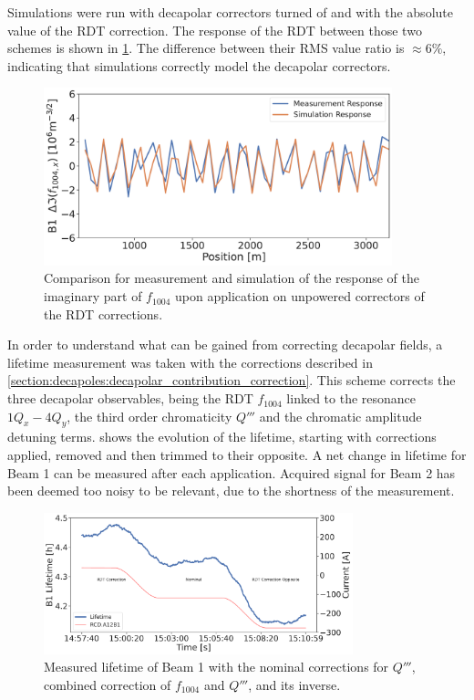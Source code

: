 Simulations were run with decapolar correctors turned of and with the absolute value of the RDT
correction. The response of the RDT between those two schemes is shown in 
\cref{fig:decapoles:rdt:b1_response_corr}. The difference between their RMS value ratio is $\approx
6\%$, indicating that simulations correctly model the decapolar correctors.

\begin{figure}[!htb]
    \centering
    \includegraphics[width=0.9\textwidth]{./images/f1004/b1_response_rdt_corr.pdf}
    \caption{Comparison for measurement and simulation of the response of the imaginary part of
    $f_{1004}$ upon application on unpowered correctors of the RDT corrections.}
    \label{fig:decapoles:rdt:b1_response_corr}
\end{figure}


In order to understand what can be gained from correcting decapolar fields, a lifetime measurement
was taken with the corrections described in 
\cref{section:decapoles:decapolar_contribution_correction}. This scheme corrects the three decapolar 
observables, being the RDT $f_{1004}$ linked to the resonance $1Q_x - 4Q_y$, the third order
chromaticity $Q'''$ and the chromatic amplitude detuning terms.
 shows the evolution of the lifetime, starting with
corrections applied, removed and then trimmed to their opposite. A net change in lifetime for Beam 1
can be measured after each application. Acquired signal for Beam 2 has been deemed too noisy to be 
relevant, due to the shortness of the measurement.

\begin{figure}[!htb]
    \centering
    \includegraphics[width=0.8\textwidth]{./images/b5_lifetime_rdt_corr.pdf}
    \caption{Measured lifetime of Beam 1 with the nominal corrections for $Q'''$, combined
    correction of $f_{1004}$ and $Q'''$, and its inverse.}
    \label{fig:decapoles:impact:b5_lifetime_rdt_corr}
\end{figure}

